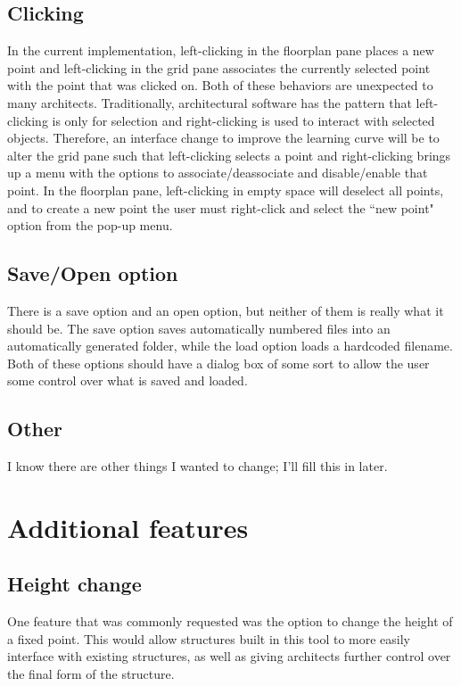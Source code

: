 \documentclass{thesis}
\begin{document}
\subsection{Clicking}
In the current implementation, left-clicking in the floorplan pane places a new point and left-clicking in the grid pane associates
the currently selected point with the point that was clicked on.  Both of these behaviors are unexpected to many architects.
Traditionally, architectural software has the pattern that left-clicking is only for selection and right-clicking is used to interact
with selected objects.  Therefore, an interface change to improve the learning curve will be to alter the grid pane such that
left-clicking selects a point and right-clicking brings up a menu with the options to associate/deassociate and disable/enable that
point.  In the floorplan pane, left-clicking in empty space will deselect all points, and to create a new point the user must
right-click and select the ``new point" option from the pop-up menu.

\subsection{Save/Open option}
There is a save option and an open option, but neither of them is really what it should be.  The save option saves automatically
numbered files into an automatically generated folder, while the load option loads a hardcoded filename.  Both of these options
should have a dialog box of some sort to allow the user some control over what is saved and loaded.

\subsection{Other}
I know there are other things I wanted to change; I'll fill this in later.

\section{Additional features}

\subsection{Height change}
One feature that was commonly requested was the option to change the height of a fixed point.  This would allow structures built
in this tool to more easily interface with existing structures, as well as giving architects further control over the final form
of the structure.
\end{document}
